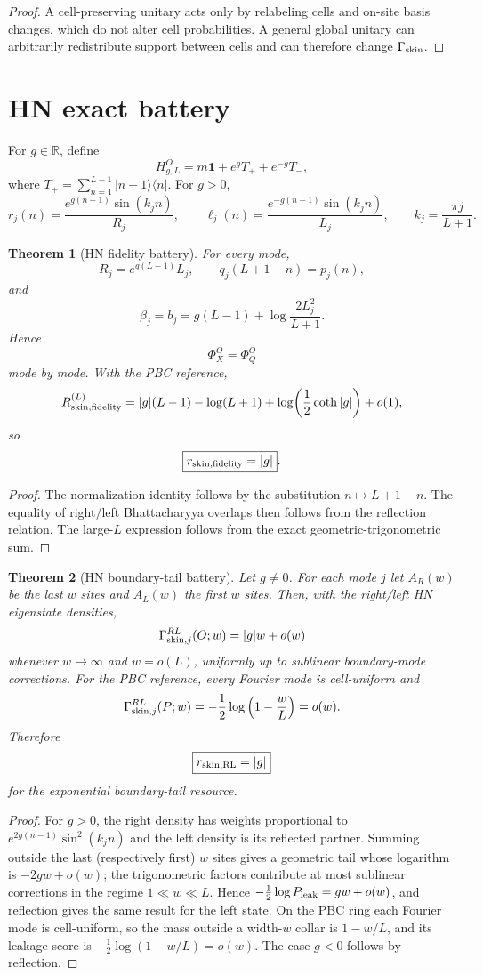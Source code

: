 \documentclass[11pt]{article}
\newtheorem{theorem}{Theorem}
\newcommand{\id}{\mathbf 1}
\newcommand{\R}{\mathbb R}
\begin{document}
\begin{proof}
A cell-preserving unitary acts only by relabeling cells and on-site basis changes, which do not alter cell probabilities. A general global unitary can arbitrarily redistribute support between cells and can therefore change $\Gamma_{\rm skin}$.
\end{proof}

\section{HN exact battery}

For $g\in\R$, define
\[
H_{g,L}^O=m\id+e^gT_++e^{-g}T_-,
\]
where $T_+=\sum_{n=1}^{L-1}|n+1\rangle\langle n|$.
For $g>0$,
\[
r_j(n)=\frac{e^{g(n-1)}\sin(k_jn)}{R_j},
\qquad
\ell_j(n)=\frac{e^{-g(n-1)}\sin(k_jn)}{L_j},
\qquad
k_j=\frac{\pi j}{L+1}.
\]

\begin{theorem}[HN fidelity battery]
For every mode,
\[
R_j=e^{g(L-1)}L_j,
\qquad
q_j(L+1-n)=p_j(n),
\]
and
\[
\beta_j=b_j
=g(L-1)+\log\frac{2L_j^2}{L+1}.
\]
Hence
\[
\Phi_X^O=\Phi_Q^O
\]
mode by mode. With the PBC reference,
\[
R_{\rm skin,fidelity}^{(L)}
=
|g|(L-1)-\log(L+1)
+\log\!\left(\frac12\coth|g|\right)+o(1),
\]
so
\[
\boxed{r_{\rm skin,fidelity}=|g|}.
\]
\end{theorem}

\begin{proof}
The normalization identity follows by the substitution $n\mapsto L+1-n$. The equality of right/left Bhattacharyya overlaps then follows from the reflection relation. The large-$L$ expression follows from the exact geometric-trigonometric sum.
\end{proof}

\begin{theorem}[HN boundary-tail battery]
Let $g\ne0$. For each mode $j$ let $A_R(w)$ be the last $w$ sites and $A_L(w)$ the first
$w$ sites. Then, with the right/left HN eigenstate densities,
\[
\Gamma_{{\rm skin},j}^{RL}(O;w)
=|g|w+o(w)
\]
whenever $w\to\infty$ and $w=o(L)$, uniformly up to sublinear boundary-mode corrections.
For the PBC reference, every Fourier mode is cell-uniform and
\[
\Gamma_{{\rm skin},j}^{RL}(P;w)
=-\frac12\log\left(1-\frac{w}{L}\right)=o(w).
\]
Therefore
\[
\boxed{r_{\rm skin,RL}=|g|}
\]
for the exponential boundary-tail resource.
\end{theorem}

\begin{proof}
For $g>0$, the right density has weights proportional to $e^{2g(n-1)}\sin^2(k_jn)$ and the left density is its reflected partner. Summing outside the last (respectively first) $w$ sites gives a geometric tail whose logarithm is $-2gw+o(w)$; the trigonometric factors contribute at most sublinear corrections in the regime $1\ll w\ll L$. Hence $-\tfrac12\log P_{\rm leak}=gw+o(w)$, and reflection gives the same result for the left state. On the PBC ring each Fourier mode is cell-uniform, so the mass outside a width-$w$ collar is $1-w/L$, and its leakage score is $-\tfrac12\log(1-w/L)=o(w)$. The case $g<0$ follows by reflection.
\end{proof}
\end{document}
